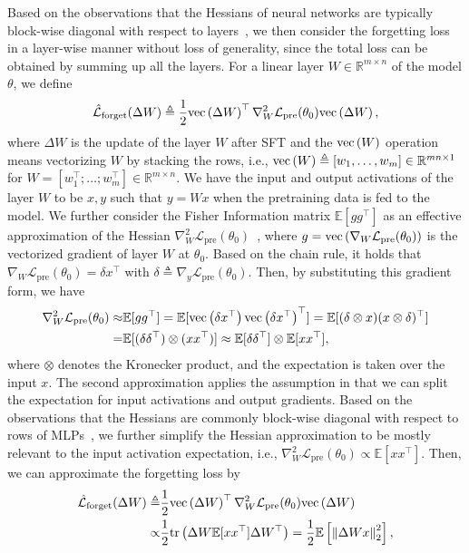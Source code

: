 \documentclass{article}
\theoremstyle{remark}
\newcommand{\Norm}[1]{\left\|#1\right\|}
\newcommand{\tr}[1]{{\rm tr}\left( #1 \right)}
\renewcommand{\vec}[1]{{\rm vec}\left( #1 \right)}
\newcommand{\EE}{\mathbb{E}}
\newcommand{\RR}{\mathbb{R}}
\newcommand{\Lp}{\mathcal{L}_{\mathrm{pre}}}
\newcommand{\Lforgeth}{\hat{\mathcal{L}}_{\mathrm{forget}}}
\begin{document}
Based on the observations that the Hessians of neural networks are typically block-wise diagonal with respect to layers~\citep{martens2015optimizing,singh2021analytic,nayak2025sculpting}, we then consider the forgetting loss in a layer-wise manner without loss of generality, since the total loss can be obtained by summing up all the layers.
For a linear layer $W \in \RR^{m\times n}$ of the model $\theta$, we define
\begin{align*}
    \Lforgeth(\Delta W) \triangleq \frac{1}{2} \vec{\Delta W}^\top \nabla_W^2 \Lp(\theta_0) \vec{\Delta W} ,
\end{align*}
where $\Delta W$ is the update of the layer $W$ after SFT and the $\vec{W}$ operation means vectorizing $W$ by stacking the rows, i.e., $\vec{W} \triangleq [w_1,\dots, w_m] \in \RR^{mn \times 1}$ for $W = [w_1^\top;\dots;w_m^\top] \in \RR^{m\times n}$.
We have the input and output activations of the layer $W$ to be $x,y$ such that $y=Wx$ when the pretraining data is fed to the model.
We further consider the Fisher Information matrix $\EE[gg^\top]$ as an effective approximation of the Hessian $\nabla_W^2 \Lp(\theta_0)$~\citep{martens2015optimizing}, where $g = \vec{\nabla_W \Lp(\theta_0)}$ is the vectorized gradient of layer $W$ at $\theta_0$. Based on the chain rule, it holds that $\nabla_W \Lp(\theta_0) = \delta x^\top$ with $\delta \triangleq \nabla_y \Lp(\theta_0)$. Then, by substituting this gradient form, we have
\begin{align*}
    \nabla_W^2 \Lp(\theta_0) \approx& \EE[gg^\top] = \EE[\vec{\delta x^\top} \vec{\delta x^\top}^\top] = \EE[(\delta\otimes x) (x \otimes \delta)^\top] \\
    =& \EE[(\delta\delta^\top) \otimes (xx^\top) ] \approx \EE[\delta \delta^\top] \otimes \EE[xx^\top],
\end{align*}
where $\otimes$ denotes the Kronecker product, and the expectation is taken over the input $x$. The second approximation applies the assumption in \citet{martens2015optimizing} that we can split the expectation for input activations and output gradients. 
Based on the observations that the Hessians are commonly block-wise diagonal with respect to rows of MLPs~\citep{collobert2004large,zhang2024transformers,zhang2024adam}, we further simplify the Hessian approximation to be mostly relevant to the input activation expectation, i.e., $\nabla_W^2 \Lp(\theta_0) \propto \EE[xx^\top]$.
Then, we can approximate the forgetting loss by
\begin{align*}
\begin{split}
    \Lforgeth(\Delta W) \triangleq& \frac{1}{2} \vec{\Delta W}^\top \nabla_W^2 \Lp(\theta_0) \vec{\Delta W} \\
    \propto & \frac{1}{2} \tr{\Delta W \EE[xx^\top] \Delta W^\top} 
    = \frac{1}{2} \EE\left[ \Norm{\Delta W x}_{2}^2 \right] ,
\end{split}
\end{align*}
\end{document}
